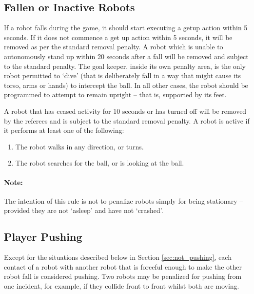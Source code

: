 \documentclass[12pt]{article}
\begin{document}
\subsection{Fallen or Inactive Robots}
\label{sec:fallenrobots}

If a robot falls during the game, it should start executing a getup action within 5 seconds. If it does not commence a get up action within 5 seconds, it will be removed as per the standard removal penalty. A robot which is unable to autonomously stand up within 20 seconds after a fall will be removed and subject to the standard penalty. The goal keeper, inside its own penalty area, is the only robot permitted to `dive' (that is deliberately fall in a way that might cause its torso, arms or hands) to intercept the ball. In all other cases, the robot should be programmed to attempt to remain upright -- that is, supported by its feet.

A robot that has ceased activity for 10 seconds or has turned off will be removed by the referees and is subject to the standard removal penalty. A robot is active if it performs at least one of the following:

\begin{enumerate}

\item The robot walks in any direction, or turns.

\item The robot searches for the ball, or is looking at the ball.

\end{enumerate}

\paragraph{Note:} The intention of this rule is not to penalize robots simply for being stationary -- provided they are not `asleep' and have not `crashed'.

\subsection{Player Pushing}
\label{sec:player_pushing}

Except for the situations described below in Section \ref{sec:not_pushing}, each contact of a robot with another robot that is forceful enough to make the other robot fall is considered pushing. Two robots may be penalized for pushing from one incident, for example, if they collide front to front whilst both are moving.
\end{document}
